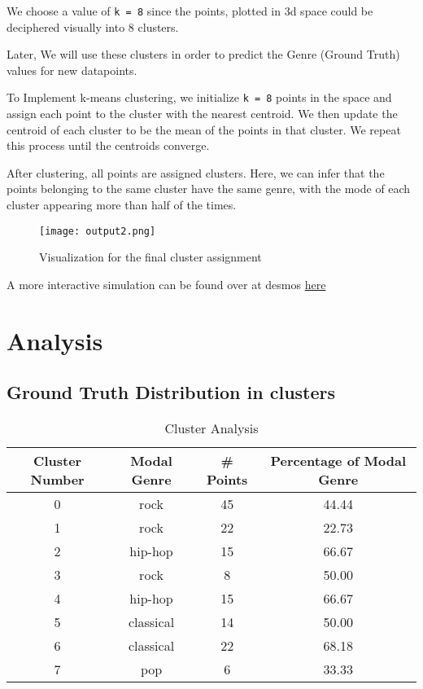 \documentclass{article}
\begin{document}
We choose a value of \texttt{k = 8} since the points, plotted in 3d space could be deciphered visually into 8 clusters.

Later, We will use these clusters in order to predict the Genre (Ground Truth) values for new datapoints.

To Implement k-means clustering, we initialize \texttt{k = 8} points in the space and assign each point to the cluster with the nearest centroid. We then update the centroid of each cluster to be the mean of the points in that cluster. We repeat this process until the centroids converge.

After clustering, all points are assigned clusters. Here, we can infer that the points belonging to the same cluster have the same genre, with the mode of each cluster appearing more than half of the times.

\cite{kmeans_gfg}
\begin{figure}[h]
\centering
\texttt{[image: output2.png]}
\caption{Visualization for the final cluster assignment}
\label{fig:cluster_assignment}
\end{figure}

A more interactive simulation can be found over at desmos \href{https://www.desmos.com/3d/njmqmzwlyy}{here}

\section{Analysis}
\subsection{Ground Truth Distribution in clusters}
\begin{table}[h]
\centering
\begin{tabular}{|c|c|c|c|}
    \hline
    \textbf{Cluster Number} & \textbf{Modal Genre} & \textbf{\# Points} & \textbf{Percentage of Modal Genre} \\
    \hline
    0 & rock & 45 & 44.44 \\
    1 & rock & 22 & 22.73 \\
    2 & hip-hop & 15 & 66.67 \\
    3 & rock & 8 & 50.00 \\
    4 & hip-hop & 15 & 66.67 \\
    5 & classical & 14 & 50.00 \\
    6 & classical & 22 & 68.18 \\
    7 & pop & 6 & 33.33 \\
    \hline
\end{tabular}
\caption{Cluster Analysis}
\label{tab:cluster_analysis}
\end{table}
\end{document}
